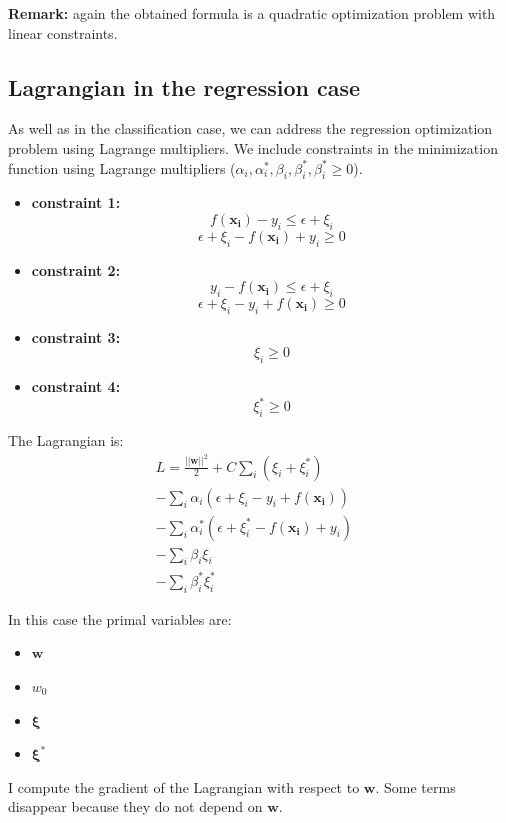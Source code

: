 \textbf{Remark:} again the obtained formula is a quadratic optimization problem with linear constraints.

\subsection{Lagrangian in the regression case}
As well as in the classification case, we can address the regression optimization problem using Lagrange multipliers. We include constraints in the minimization function using Lagrange multipliers ($\alpha_i, \alpha_i^*, \beta_i, \beta_i^*, \beta_i^* \geq 0$).

\begin{itemize}
    \item \textbf{constraint 1:} $$f(\pmb{x_i})-y_i \leq \epsilon + \xi_i$$
    $$\epsilon + \xi_i-f(\pmb{x_i})+y_i \geq 0$$
    
    \item \textbf{constraint 2:}
    $$y_i - f(\pmb{x_i}) \leq \epsilon + \xi_i$$
    $$\epsilon + \xi_i -y_i + f(\pmb{x_i}) \geq 0$$
    
    \item \textbf{constraint 3:}
    $$\xi_i \geq 0$$
    
    \item \textbf{constraint 4:}
    $$\xi_i^* \geq 0$$
\end{itemize}

The Lagrangian is:
\begin{align*}
    L = \frac{||\pmb{w}||^2}{2} + C \sum_i (\xi_i + \xi_i^*) &\\
    - \sum_i \alpha_i (\epsilon + \xi_i - y_i + f(\pmb{x_i})) &\\
    - \sum_i \alpha_i^* (\epsilon + \xi_i^* - f(\pmb{x_i})+y_i) &\\
    - \sum_i \beta_i \xi_i &\\
    - \sum_i \beta_i^* \xi_i^*
\end{align*}

In this case the primal variables are:
\begin{itemize}
    \item $\pmb{w}$
    \item $w_0$
    \item $\pmb{\xi}$
    \item $\pmb{\xi}^*$
\end{itemize}

I compute the gradient of the Lagrangian with respect to $\pmb{w}$. Some terms disappear because they do not depend on $\pmb{w}$.

